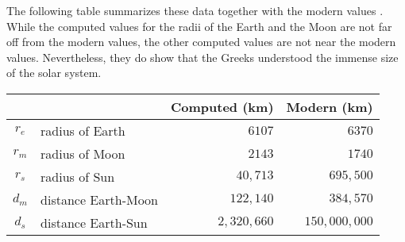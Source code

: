 The following table summarizes these data together with the modern values \cite[Table~1.3]{hahn-cic}. While the computed values for the radii of the Earth and the Moon are not far off from the modern values, the other computed values are not near the modern values. Nevertheless, they do show that the Greeks understood the immense size of the solar system.\label{p.table1}
\begin{center}
\begin{tabular}{|cl|r|r|}
\hline
\multicolumn{2}{|c|}{}&Computed (km)&Modern (km)\\
\hline\hline
$r_e$&radius of Earth& $6107$   & $6370$\\
$r_m$&radius of Moon&  $2143$   & $1740$\\
$r_s$&radius of Sun&   $40,713$ & $695,500$\\
$d_m$&distance Earth-Moon& $122,140$   & $384,570$\\
$d_s$&distance Earth-Sun&  $2,320,660$ & $150,000,000$\\
\hline
\end{tabular}
\end{center}

